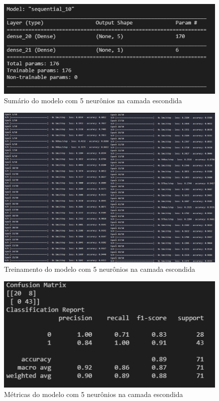 \documentclass[12pt]{article}
\begin{document}
\begin{figure}[H]
	\centering
	\includegraphics[width=0.7\linewidth]{Imagens/5neuronios/sumario5neuronios}
	\caption{Sumário do modelo com 5 neurônios na camada escondida}
	\label{fig:sumario5neuronios}
\end{figure}
\begin{figure}[H]
	\centering
	\includegraphics[width=1.1\linewidth]{Imagens/5neuronios/fit5neuronios}
	\caption{Treinamento do modelo com 5 neurônios na camada escondida}
	\label{fig:fit5neuronios}
\end{figure}
\begin{figure}[H]
	\centering
	\includegraphics[width=0.7\linewidth]{Imagens/5neuronios/metricas5neuronios}
	\caption{Métricas do modelo com 5 neurônios na camada escondida}
	\label{fig:metricas5neuronios}
\end{figure}
\end{document}
